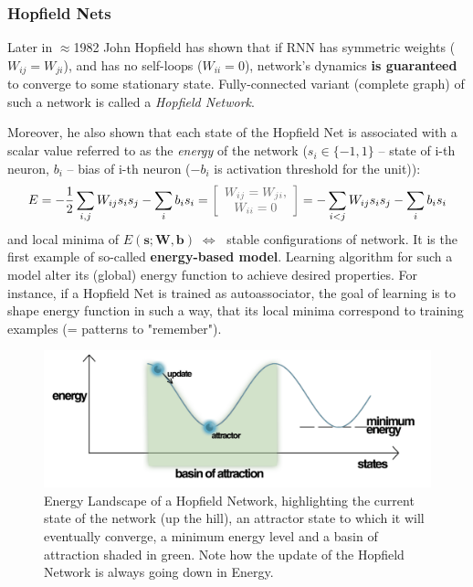 \vspace{1em}
\subsubsection{Hopfield Nets}
Later in $\approx$1982 John Hopfield has shown that if RNN has symmetric weights ($W_{ij}=W_{ji}$), and has no self-loops ($W_{ii}=0$), network's dynamics \textbf{is guaranteed} to converge to some stationary state. Fully-connected variant (complete graph) of such a network is called a \emph{Hopfield Network}.

Moreover, he also shown that each state of the Hopfield Net is associated with a scalar value referred to as the \emph{energy} of the network ($s_{i}\in\{-1, 1\}$ -- state of i-th neuron, $b_{i}$ -- bias of i-th neuron ($-b_{i}$ is activation threshold for the unit)):
\begin{align}
E = -\frac{1}{2}\sum_{i,j}W_{ij}s_is_j-\sum_{i}b_is_i=\commenttwo{$W_{ij}=W_{ji}$,}{$W_{ii}=0$} = -\sum_{i<j}W_{ij}s_is_j-\sum_{i}b_is_i
\end{align}
and local minima of $E(\mathbf{s};\mathbf{W}, \mathbf{b})\;\Leftrightarrow\;$ stable configurations of network. It is the first example of so-called \textbf{energy-based model}. Learning algorithm for such a model alter its (global) energy function to achieve desired properties. For instance, if a Hopfield Net is trained as autoassociator, the goal of learning is to shape energy function in such a way, that its local minima correspond to training examples (= patterns to "remember").
\begin{figure}[h]
\begin{mdframed}
\includegraphics[scale=0.2]{img/energy_landscape.png}
\centering
\caption{Energy Landscape of a Hopfield Network, highlighting the current state of the network (up the hill), an attractor state to which it will eventually converge, a minimum energy level and a basin of attraction shaded in green. Note how the update of the Hopfield Network is always going down in Energy.}
\label{fig:energy_landscape}
\end{mdframed}
\end{figure}


